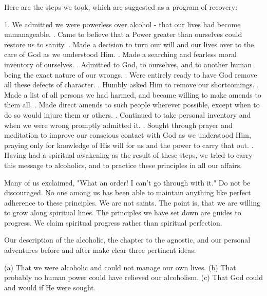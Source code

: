 \begin{biblechapter}
    Here are the steps we took, 
    which are suggested as a program of recovery:

1. We admitted we were powerless over alcohol - 
    that our lives had become unmanageable.
. Came to believe 
    that a Power greater than ourselves 
    could restore us to sanity.
. Made a decision to turn our will and our lives 
    over to the care of God as we understood Him.
. Made a searching and fearless moral inventory of ourselves.
. Admitted to God, 
    to ourselves, 
    and to another human being 
    the exact nature of our wrongs.
. Were entirely ready to have God 
    remove all these defects of character.
. Humbly asked Him to remove our shortcomings.
. Made a list of all persons we had harmed, 
    and became willing to make amends to them all.
. Made direct amends to such people wherever possible, 
    except when to do so would injure them or others.
. Continued to take personal inventory 
    and when we were wrong promptly admitted it.
. Sought through prayer and meditation 
    to improve our conscious contact with God as we understood Him, 
    praying only for knowledge of His will for us 
    and the power to carry that out.
. Having had a spiritual awakening as the result of these steps, 
    we tried to carry this message to alcoholics, 
    and to practice these principles in all our affairs.
\end{biblechapter}


\begin{biblechapter}
    Many of us exclaimed, 
    "What an order! I can't go through with it."
\verse Do not be discouraged.
\verse No one among us has been able to maintain anything like 
    perfect adherence to these principles.
\verse We are not saints.
\verse The point is, that we are willing to grow along spiritual lines.
\verse The principles we have set down are guides to progress.
\verse We claim spiritual progress rather than spiritual perfection.

\verse Our description of the alcoholic, 
    the chapter to the agnostic, 
    and our personal adventures before and after 
    make clear three pertinent ideas:

\verse (a) That we were alcoholic and could not manage our own lives.
\verse (b) That probably no human power could have relieved our alcoholism.
\verse (c) That God could and would if He were sought.
\end{biblechapter}


